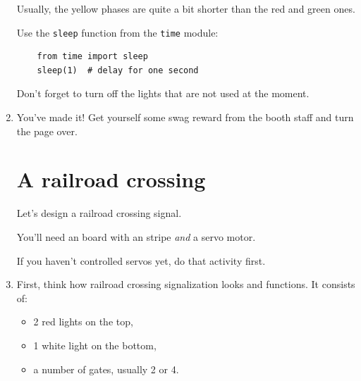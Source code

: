 \documentclass{../tutorial}
\begin{document}
\begin{enumerate}
    Usually, the yellow phases are quite a bit shorter than
    the red and green ones.

    Use the \lstinline|sleep| function from the \lstinline|time| module:

    \begin{lstlisting}
    from time import sleep
    sleep(1)  # delay for one second
    \end{lstlisting}

    Don't forget to turn off the lights that are not used at the moment.

\item
    You've made it!
    Get yourself some swag reward from the booth staff and turn the page over.

\clearpage

\section{A railroad crossing}

    Let's design a railroad crossing signal.

    You'll need an  board with an   stripe
    \emph{and} a servo motor.

    If you haven't controlled servos yet, do that activity first.

\item
    First, think how railroad crossing signalization looks and functions.
    It consists of:

    \begin{itemize}
    \item 2 red lights on the top,
    \item 1 white light on the bottom,
    \item a number of gates, usually 2 or 4.
    \end{itemize}


\end{enumerate}
\end{document}
